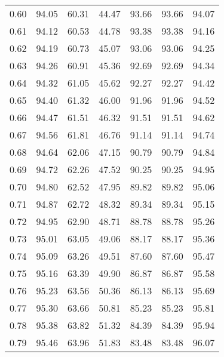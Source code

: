 \begin{tabular}{|c|c|c|c|c|c|c|}
      0.60 &     94.05 &     60.31 &      44.47 &   93.66 &      93.66 &         94.07 \\
      0.61 &     94.12 &     60.53 &      44.78 &   93.38 &      93.38 &         94.16 \\
      0.62 &     94.19 &     60.73 &      45.07 &   93.06 &      93.06 &         94.25 \\
      0.63 &     94.26 &     60.91 &      45.36 &   92.69 &      92.69 &         94.34 \\
      0.64 &     94.32 &     61.05 &      45.62 &   92.27 &      92.27 &         94.42 \\
      0.65 &     94.40 &     61.32 &      46.00 &   91.96 &      91.96 &         94.52 \\
      0.66 &     94.47 &     61.51 &      46.32 &   91.51 &      91.51 &         94.62 \\
      0.67 &     94.56 &     61.81 &      46.76 &   91.14 &      91.14 &         94.74 \\
      0.68 &     94.64 &     62.06 &      47.15 &   90.79 &      90.79 &         94.84 \\
      0.69 &     94.72 &     62.26 &      47.52 &   90.25 &      90.25 &         94.95 \\
      0.70 &     94.80 &     62.52 &      47.95 &   89.82 &      89.82 &         95.06 \\
      0.71 &     94.87 &     62.72 &      48.32 &   89.34 &      89.34 &         95.15 \\
      0.72 &     94.95 &     62.90 &      48.71 &   88.78 &      88.78 &         95.26 \\
      0.73 &     95.01 &     63.05 &      49.06 &   88.17 &      88.17 &         95.36 \\
      0.74 &     95.09 &     63.26 &      49.51 &   87.60 &      87.60 &         95.47 \\
      0.75 &     95.16 &     63.39 &      49.90 &   86.87 &      86.87 &         95.58 \\
      0.76 &     95.23 &     63.56 &      50.36 &   86.13 &      86.13 &         95.69 \\
      0.77 &     95.30 &     63.66 &      50.81 &   85.23 &      85.23 &         95.81 \\
      0.78 &     95.38 &     63.82 &      51.32 &   84.39 &      84.39 &         95.94 \\
      0.79 &     95.46 &     63.96 &      51.83 &   83.48 &      83.48 &         96.07 \\

\end{tabular}
